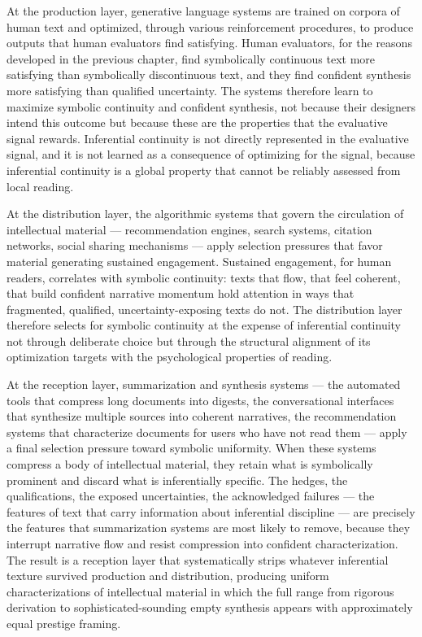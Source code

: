 \documentclass[12pt, openright, twoside]{book}
\begin{document}
At the production layer, generative language systems are trained on corpora
of human text and optimized, through various reinforcement procedures, to
produce outputs that human evaluators find satisfying. Human evaluators, for
the reasons developed in the previous chapter, find symbolically continuous
text more satisfying than symbolically discontinuous text, and they find
confident synthesis more satisfying than qualified uncertainty. The systems
therefore learn to maximize symbolic continuity and confident synthesis, not
because their designers intend this outcome but because these are the
properties that the evaluative signal rewards. Inferential continuity is not
directly represented in the evaluative signal, and it is not learned as a
consequence of optimizing for the signal, because inferential continuity is
a global property that cannot be reliably assessed from local reading.

At the distribution layer, the algorithmic systems that govern the circulation
of intellectual material --- recommendation engines, search systems, citation
networks, social sharing mechanisms --- apply selection pressures that favor
material generating sustained engagement. Sustained engagement, for human
readers, correlates with symbolic continuity: texts that flow, that feel
coherent, that build confident narrative momentum hold attention in ways that
fragmented, qualified, uncertainty-exposing texts do not. The distribution
layer therefore selects for symbolic continuity at the expense of inferential
continuity not through deliberate choice but through the structural alignment
of its optimization targets with the psychological properties of reading.

At the reception layer, summarization and synthesis systems --- the automated
tools that compress long documents into digests, the conversational interfaces
that synthesize multiple sources into coherent narratives, the recommendation
systems that characterize documents for users who have not read them --- apply
a final selection pressure toward symbolic uniformity. When these systems
compress a body of intellectual material, they retain what is symbolically
prominent and discard what is inferentially specific. The hedges, the
qualifications, the exposed uncertainties, the acknowledged failures --- the
features of text that carry information about inferential discipline --- are
precisely the features that summarization systems are most likely to remove,
because they interrupt narrative flow and resist compression into confident
characterization. The result is a reception layer that systematically strips
whatever inferential texture survived production and distribution, producing
uniform characterizations of intellectual material in which the full range
from rigorous derivation to sophisticated-sounding empty synthesis appears
with approximately equal prestige framing.
\end{document}
